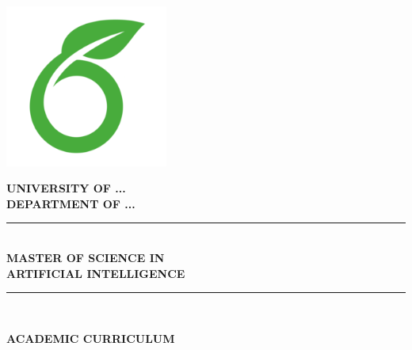 \begin{titlepage}
\newcommand{\HRule}{\rule{\linewidth}{0.5mm}}                           %
\center



\includegraphics[width=0.4\textwidth]{logo.png}\\[0.2cm]  %

\vfill

\textbf{\Large UNIVERSITY OF ...  }\\
\textbf{\Large DEPARTMENT OF ... }\\

\vfill

\HRule \\[0.8cm]
\textbf{\Large MASTER OF SCIENCE IN}\\[0.2cm]
\textbf{\Large ARTIFICIAL INTELLIGENCE}\\[0.8cm]
\HRule \\

\vfill


\textbf{\Large ACADEMIC CURRICULUM}\\[0.8cm]


\vfill


\end{titlepage}